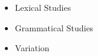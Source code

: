 \documentclass[a4paper,landscape,headrule,footrule,xetex]{foils}
\begin{document}

\maketitle



\begin{itemize} 
\item Lexical Studies
\item Grammatical Studies
\item Variation
\end{itemize}





\end{document}
